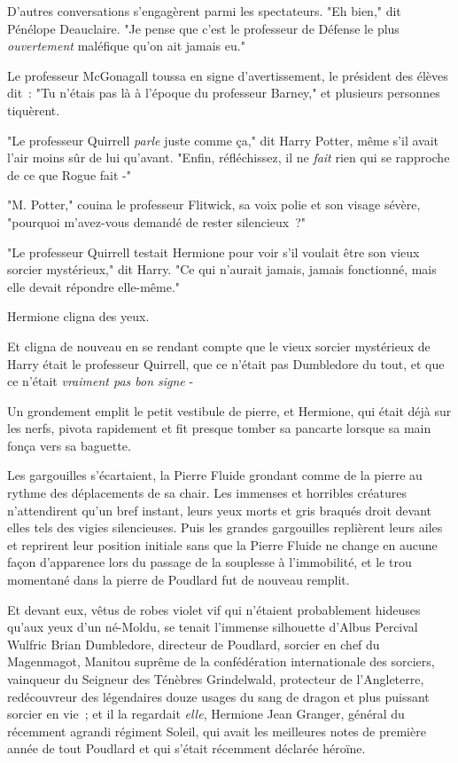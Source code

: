 D'autres conversations s'engagèrent parmi les spectateurs. "Eh bien," dit Pénélope Deauclaire. "Je pense que c'est le professeur de Défense le plus \emph{ouvertement} maléfique qu'on ait jamais eu."

Le professeur McGonagall toussa en signe d'avertissement, le président des élèves dit~: "Tu n'étais pas là à l'époque du professeur Barney," et plusieurs personnes tiquèrent.

"Le professeur Quirrell \emph{parle} juste comme ça," dit Harry Potter, même s'il avait l'air moins sûr de lui qu'avant. "Enfin, réfléchissez, il ne \emph{fait} rien qui se rapproche de ce que Rogue fait -"

"M. Potter," couina le professeur Flitwick, sa voix polie et son visage sévère, "pourquoi m'avez-vous demandé de rester silencieux~?"

"Le professeur Quirrell testait Hermione pour voir s'il voulait être son vieux sorcier mystérieux," dit Harry. "Ce qui n'aurait jamais, jamais fonctionné, mais elle devait répondre elle-même."

Hermione cligna des yeux.

Et cligna de nouveau en se rendant compte que le vieux sorcier mystérieux de Harry était le professeur Quirrell, que ce n'était pas Dumbledore du tout, et que ce n'était \emph{vraiment pas bon signe} -

Un grondement emplit le petit vestibule de pierre, et Hermione, qui était déjà sur les nerfs, pivota rapidement et fit presque tomber sa pancarte lorsque sa main fonça vers sa baguette.

Les gargouilles s'écartaient, la Pierre Fluide grondant comme de la pierre au rythme des déplacements de sa chair. Les immenses et horribles créatures n'attendirent qu'un bref instant, leurs yeux morts et gris braqués droit devant elles tels des vigies silencieuses. Puis les grandes gargouilles replièrent leurs ailes et reprirent leur position initiale sans que la Pierre Fluide ne change en aucune façon d'apparence lors du passage de la souplesse à l'immobilité, et le trou momentané dans la pierre de Poudlard fut de nouveau remplit.

Et devant eux, vêtus de robes violet vif qui n'étaient probablement hideuses qu'aux yeux d'un né-Moldu, se tenait l'immense silhouette d'Albus Percival Wulfric Brian Dumbledore, directeur de Poudlard, sorcier en chef du Magenmagot, Manitou suprême de la confédération internationale des sorciers, vainqueur du Seigneur des Ténèbres Grindelwald, protecteur de l'Angleterre, redécouvreur des légendaires douze usages du sang de dragon et plus puissant sorcier en vie~; et il la regardait \emph{elle}, Hermione Jean Granger, général du récemment agrandi régiment Soleil, qui avait les meilleures notes de première année de tout Poudlard et qui s'était récemment déclarée héroïne.

